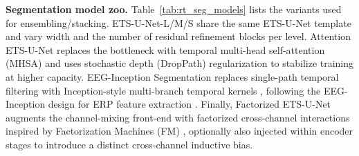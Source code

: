 \documentclass[12pt]{article}
\begin{document}
\textbf{Segmentation model zoo.} Table~\ref{tab:rt_seg_models} lists the variants used for ensembling/stacking.
ETS-U-Net-L/M/S share the same ETS-U-Net template and vary width and the number of residual refinement blocks per level.
Attention ETS-U-Net replaces the bottleneck with temporal multi-head self-attention (MHSA) \citep{vaswani2017attention} and uses
stochastic depth (DropPath) regularization \citep{huang2016stochasticdepth} to stabilize training at higher capacity.
EEG-Inception Segmentation replaces single-path temporal filtering with Inception-style multi-branch temporal kernels
\citep{szegedy2015going}, following the EEG-Inception design for ERP feature extraction \citep{santamaria2020eeginception}.
Finally, Factorized ETS-U-Net augments the channel-mixing front-end with factorized cross-channel interactions inspired by
Factorization Machines (FM) \citep{rendle2010fm}, optionally also injected within encoder stages to introduce a distinct
cross-channel inductive bias.
\end{document}
